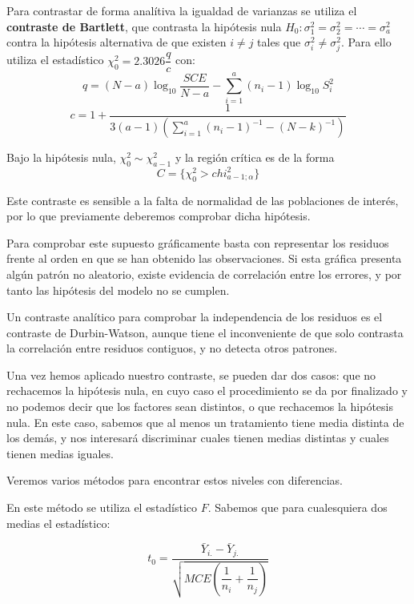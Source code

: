Para contrastar de forma anal\'itiva la igualdad de varianzas se utiliza el \textbf{contraste de Bartlett}, que contrasta la hip\'otesis nula $H_0:\sigma_1^2=\sigma_2^2=\cdots=\sigma_a^2$ contra la hip\'otesis alternativa de que existen $i\neq j$ tales que $\sigma_i^2\neq\sigma_j^2$. Para ello utiliza el estad\'istico $\chi^2_0=2.3026\dfrac{q}{c}$ con:
\[q=(N-a)\log_{10}{\dfrac{SCE}{N-a}}-\sum_{i=1}^a(n_i-1)\log_{10}{S_i^2}\]
\[c=1+\dfrac{1}{3(a-1)\left(\sum_{i=1}^a(n_i-1)^{-1}-(N-k)^{-1}\right)}\]

Bajo la hip\'otesis nula, $\chi^2_0\sim\chi^2_{a-1}$ y la regi\'on cr\'itica es de la forma
\[C=\{\chi^2_0>chi^2_{a-1;\alpha}\}\]

Este contraste es sensible a la falta de normalidad de las poblaciones de inter\'es, por lo que previamente deberemos comprobar dicha hip\'otesis.


Para comprobar este supuesto gr\'aficamente basta con representar los residuos frente al orden en que se han obtenido las observaciones. Si esta gr\'afica presenta alg\'un patr\'on no aleatorio, existe evidencia de correlaci\'on entre los errores, y por tanto las hip\'otesis del modelo no se cumplen.

Un contraste anal\'itico para comprobar la independencia de los residuos es el contraste de Durbin-Watson, aunque tiene el inconveniente de que solo contrasta la correlaci\'on entre residuos contiguos, y no detecta otros patrones.


Una vez hemos aplicado nuestro contraste, se pueden dar dos casos: que no rechacemos la hip\'otesis nula, en cuyo caso el procedimiento se da por finalizado y no podemos decir que los factores sean distintos, o que rechacemos la hip\'otesis nula. En este caso, sabemos que al menos un tratamiento tiene media distinta de los dem\'as, y nos interesar\'a discriminar cuales tienen medias distintas y cuales tienen medias iguales.

Veremos varios m\'etodos para encontrar estos niveles con diferencias.


En este m\'etodo se utiliza el estad\'istico $F$. Sabemos que para cualesquiera dos medias el estad\'istico:

\[t_0=\dfrac{\bar{Y}_{i.}-\bar{Y}_{j.}}{\sqrt{MCE\left(\dfrac{1}{n_i}+\dfrac{1}{n_j}\right)}}\]

